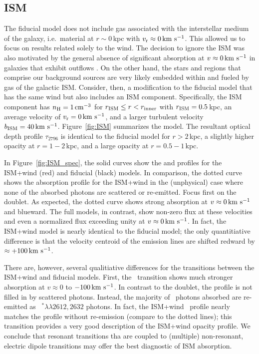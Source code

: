 \documentclass[12pt,preprint]{aastex}
\begin{document}
\subsection{ISM}
\label{sec:ISM}

The fiducial model does not include gas associated with
the interstellar medium of the galaxy, i.e.\ material at $r \sim
0$\,kpc with $v_{\rm r} \approx 0 \, {\rm km~s^{-1}}$.  This allowed us to focus on
results related solely to the wind.  The decision to ignore the ISM
was also motivated by the general absence of significant absorption at
$v \approx 0 \, {\rm km~s^{-1}}$ in galaxies that exhibit outflows 
\citep[e.g.][]{wcp+09,steidel+10,rubin+10b}.
On the other hand, the stars and  regions that comprise our
background sources are very likely embedded within and fueled by gas
of the galactic ISM.  
Consider, then, a modification to the fiducial model that has the
same wind but also includes an ISM component. 
Specifically, the ISM component has $n_{\rm H} = 1 \, {\rm cm^{-3}}$ for
$r_{\rm ISM} \le r < r_{\rm inner}$ with $r_{\rm ISM} = 0.5$\,kpc, 
an average velocity of $v_{\rm r} = 0 \, {\rm km~s^{-1}}$, and a larger turbulent velocity $b_{\rm ISM} = 40 \, {\rm km~s^{-1}}$.
Figure~\ref{fig:ISM} summarizes the model.
The resultant optical depth profile $\tau_{2796}$ is identical to the
fiducial model for $r > 2$\,kpc, a slightly higher opacity at
$r=1-2$\,kpc, and a large opacity at $r = 0.5-1$\,kpc.

In Figure~\ref{fig:ISM_spec}, the solid curves show the  and
 profiles for the ISM+wind (red) and fiducial (black)
models. In comparison, the
dotted curve shows the absorption profile for the ISM+wind in the (unphysical) case
where none of the absorbed photons are scattered or re-emitted.   Focus first on the
 doublet.  As expected, the dotted curve shows strong
absorption at $v \approx 0 \, {\rm km~s^{-1}}$ and blueward.  The full models,
in contrast, show non-zero flux at these velocities and even a
normalized flux exceeding unity at $v \approx 0 \, {\rm km~s^{-1}}$.  In
fact, the ISM+wind model is nearly identical to the fiducial model;
the only quantitiative difference is that the velocity centroid of
the emission lines are shifted redward by $\approx +100 \, {\rm km~s^{-1}}$.

There are, however, several qualitiative differences 
for the  transitions between the ISM+wind and fiducial
models.
First,
the \feiia\ transition shows much stronger absorption at $v \approx 0$
to $-100 \, {\rm km~s^{-1}}$.  In contrast to the  doublet,
the profile is not filled in by scattered photons. Instead, 
the majority of \feiia\ photons absorbed are re-emitted as
~$^* \lambda\lambda 2612, 2632$ photons.  In fact, the
ISM+wind \feiia\ profile nearly matches the profile without re-emission 
(compare to the dotted lines); this transition provides a
very good description of the ISM+wind opacity profile.  
We conclude that resonant transitions tha are coupled to (multiple)
non-resonant, electric dipole transitions may offer the best
diagnostic of ISM absorption.
\end{document}
